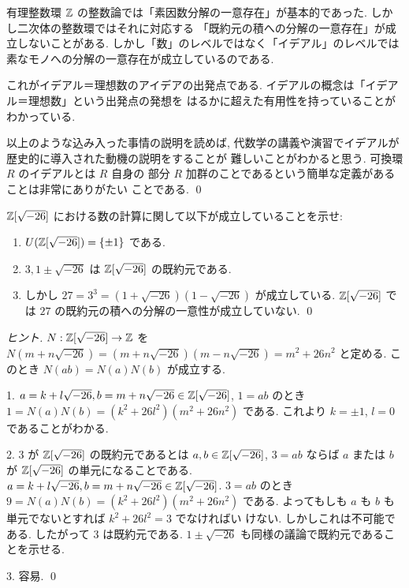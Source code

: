 \documentclass[12pt,twoside]{jarticle}
\begin{document}
\begin{guide}[二次体の整数環]
 有理整数環 ${\mathbb Z}$ の整数論では「素因数分解の一意存在」が基本的であった.
 しかし二次体の整数環ではそれに対応する
 「既約元の積への分解の一意存在」が成立しないことがある. 
 しかし「数」のレベルではなく「イデアル」のレベルでは
 素なモノへの分解の一意存在が成立しているのである.

 これがイデアル＝理想数のアイデアの出発点である.
 イデアルの概念は「イデアル＝理想数」という出発点の発想を
 はるかに超えた有用性を持っていることがわかっている.

 以上のような込み入った事情の説明を読めば, 
 代数学の講義や演習でイデアルが歴史的に導入された動機の説明をすることが
 難しいことがわかると思う.  可換環 $R$ のイデアルとは $R$ 自身の
 部分 $R$ 加群のことであるという簡単な定義があることは非常にありがたい
 ことである. 
 \qed
\end{guide}

\begin{question}
\label{q:Z[sqrt(-26)]}
 ${\mathbb Z}[\sqrt{-26}]$ における数の計算に関して以下が成立していることを示せ:
 \begin{enumerate}
  \item $U({\mathbb Z}[\sqrt{-26}])=\{\pm1\}$ である.
  \item $3, 1\pm\sqrt{-26}$ は ${\mathbb Z}[\sqrt{-26}]$ の既約元である.
  \item しかし $27=3^3=(1+\sqrt{-26})(1-\sqrt{-26})$ が成立している.
   ${\mathbb Z}[\sqrt{-26}]$ では $27$ の既約元の積への分解の一意性が成立していない.
   \qed
 \end{enumerate}
\end{question}

\begin{proof}[ヒント]
 $N:{\mathbb Z}[\sqrt{-26}]\to{\mathbb Z}$ 
 を $N(m+n\sqrt{-26})=(m+n\sqrt{-26})(m-n\sqrt{-26})=m^2+26n^2$ と定める.
 このとき $N(ab)=N(a)N(b)$ が成立する.

 1. $a=k+l\sqrt{-26},b=m+n\sqrt{-26}\in{\mathbb Z}[\sqrt{-26}]$, $1=ab$ 
 のとき $1=N(a)N(b)=(k^2+26l^2)(m^2+26n^2)$ である.
 これより $k=\pm 1$, $l=0$ であることがわかる.

 2. $3$ が ${\mathbb Z}[\sqrt{-26}]$ の既約元であるとは %
 $a,b\in{\mathbb Z}[\sqrt{-26}]$, $3=ab$ ならば %
 $a$ または $b$ が ${\mathbb Z}[\sqrt{-26}]$ の単元になることである.
 $a=k+l\sqrt{-26},b=m+n\sqrt{-26}\in{\mathbb Z}[\sqrt{-26}]$. $3=ab$ 
 のとき $9=N(a)N(b)=(k^2+26l^2)(m^2+26n^2)$ である.
 よってもしも $a$ も $b$ も単元でないとすれば $k^2+26l^2=3$ でなければい
 けない. しかしこれは不可能である. したがって $3$ は既約元である.
 $1\pm\sqrt{-26}$ も同様の議論で既約元であることを示せる.

 3. 容易.
 \qed
\end{proof}
\end{document}
